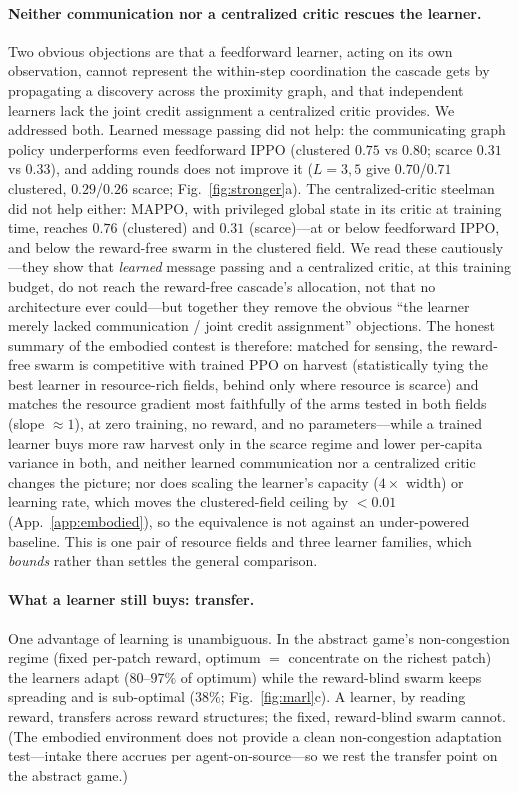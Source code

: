\documentclass{article}
\begin{document}
\paragraph{Neither communication nor a centralized critic rescues the learner.} Two obvious objections are that
a feedforward learner, acting on its own observation, cannot represent the within-step coordination the cascade
gets by propagating a discovery across the proximity graph, and that independent learners lack the joint credit
assignment a centralized critic provides. We addressed both. Learned message passing did not help: the
communicating graph policy underperforms even feedforward IPPO (clustered $0.75$ vs $0.80$; scarce $0.31$ vs
$0.33$), and adding rounds does not improve it ($L{=}3,5$ give $0.70$/$0.71$ clustered, $0.29$/$0.26$ scarce;
Fig.~\ref{fig:stronger}a). The centralized-critic steelman did not help either: MAPPO, with privileged global
state in its critic at training time, reaches $0.76$ (clustered) and $0.31$ (scarce)---at or below feedforward
IPPO, and below the reward-free swarm in the clustered field. We read these cautiously---they show that
\emph{learned} message passing and a centralized critic, at this training budget, do not reach the reward-free
cascade's allocation, not that no architecture ever could---but together they remove the obvious ``the learner
merely lacked communication / joint credit assignment'' objections. The honest summary of the embodied contest
is therefore: matched for sensing, the reward-free swarm is competitive with trained PPO on harvest (statistically
tying the best learner in resource-rich fields, behind only where resource is scarce) and matches the resource
gradient most faithfully of the arms tested in both fields (slope ${\approx}1$), at zero training, no reward, and no
parameters---while a trained learner buys more raw harvest only in the scarce regime and lower per-capita
variance in both, and neither learned communication nor a centralized critic changes the picture; nor does
scaling the learner's capacity ($4\times$ width) or learning rate, which moves the clustered-field ceiling by
${<}0.01$ (App.~\ref{app:embodied}), so the equivalence is not against an under-powered baseline. This is one
pair of resource fields and three learner families, which \emph{bounds} rather than settles the general
comparison.

\paragraph{What a learner still buys: transfer.} One advantage of learning is unambiguous. In the abstract
game's non-congestion regime (fixed per-patch reward, optimum $=$ concentrate on the richest patch) the
learners adapt ($80$--$97\%$ of optimum) while the reward-blind swarm keeps spreading and is sub-optimal
($38\%$; Fig.~\ref{fig:marl}c). A learner, by reading reward, transfers across reward structures; the fixed,
reward-blind swarm cannot. (The embodied environment does not provide a clean non-congestion adaptation
test---intake there accrues per agent-on-source---so we rest the transfer point on the abstract game.)
\end{document}
